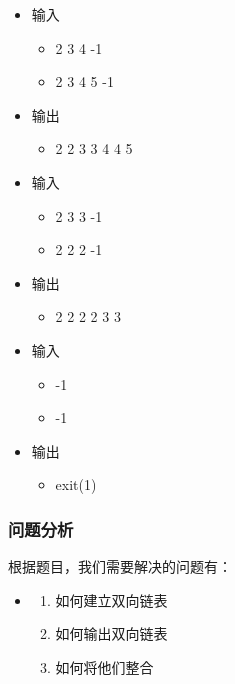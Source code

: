 \documentclass[UTF8]{ctexart}
\begin{document}
\begin{itemize}
    \item 输入
        \begin{itemize}
            \item[ ]2 3 4 -1
            \item[ ]2 3 4 5 -1
        \end{itemize}
    \item 输出
    \begin{itemize}
        \item[ ] 2 2 3 3 4 4 5
    \end{itemize}

        \item 输入
        \begin{itemize}
            \item[ ]2 3 3 -1
            \item[ ]2 2 2 -1
        \end{itemize}
    \item 输出
    \begin{itemize}
        \item[ ] 2 2 2 2 3 3
    \end{itemize}

    \item 输入
    \begin{itemize}
        \item[ ]-1
        \item[ ]-1
    \end{itemize}
    \item 输出
    \begin{itemize}
        \item[ ] exit(1)
    \end{itemize}
\end{itemize}
	
	\subsubsection{问题分析}
	\indent 根据题目，我们需要解决的问题有：
	\begin{itemize}
	\item[ ]
	\begin{enumerate}
    \item 如何建立双向链表
    \item 如何输出双向链表
    \item 如何将他们整合
	\end{enumerate}
	\end{itemize}	
	
\end{document}
